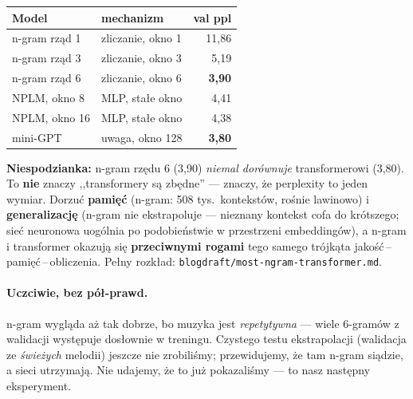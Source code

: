 \documentclass[11pt]{article}
\begin{document}
\begin{center}
\begin{tabular}{@{}llr@{}}
\toprule
Model & mechanizm & val ppl \\
\midrule
n-gram rząd 1 & zliczanie, okno 1 & 11{,}86 \\
n-gram rząd 3 & zliczanie, okno 3 & 5{,}19 \\
n-gram rząd 6 & zliczanie, okno 6 & \textbf{3{,}90} \\
NPLM, okno 8 & MLP, stałe okno & 4{,}41 \\
NPLM, okno 16 & MLP, stałe okno & 4{,}38 \\
mini-GPT & uwaga, okno 128 & \textbf{3{,}80} \\
\bottomrule
\end{tabular}
\end{center}

\noindent\textbf{Niespodzianka:} n-gram rzędu 6 (3{,}90) \emph{niemal dorównuje} transformerowi (3{,}80). To
\textbf{nie} znaczy ,,transformery są zbędne'' --- znaczy, że perplexity to jeden wymiar. Dorzuć
\textbf{pamięć} (n-gram: 508 tys.\ kontekstów, rośnie lawinowo) i \textbf{generalizację} (n-gram nie
ekstrapoluje --- nieznany kontekst cofa do krótszego; sieć neuronowa uogólnia po podobieństwie w przestrzeni
embeddingów), a n-gram i transformer okazują się \textbf{przeciwnymi rogami} tego samego trójkąta
jakość\,--\,pamięć\,--\,obliczenia. Pełny rozkład: \texttt{blogdraft/most-ngram-transformer.md}.

\paragraph{Uczciwie, bez pół-prawd.} n-gram wygląda aż tak dobrze, bo muzyka jest \emph{repetytywna} --- wiele
6-gramów z walidacji występuje dosłownie w treningu. Czystego testu ekstrapolacji (walidacja ze \emph{świeżych}
melodii) jeszcze nie zrobiliśmy; przewidujemy, że tam n-gram siądzie, a sieci utrzymają. Nie udajemy, że to już
pokazaliśmy --- to nasz następny eksperyment.
\end{document}
